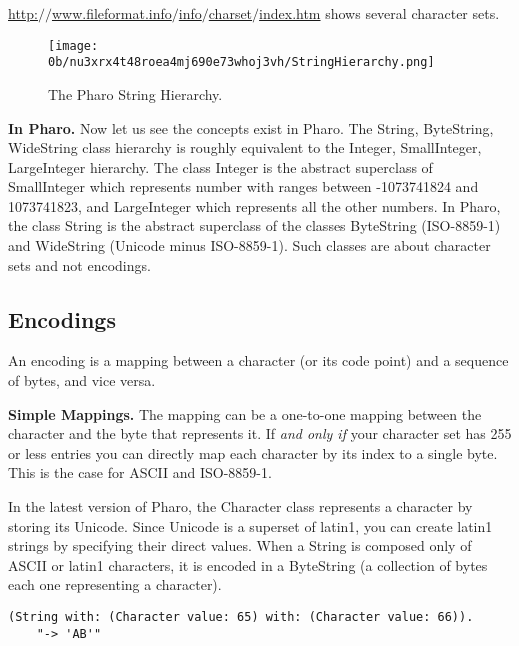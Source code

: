\documentclass[a4paper,10pt,twoside]{book}
\newcommand{\ct}[1]{{\small\ttfamily\textup{#1}}}
\begin{document}
\href{http://www.fileformat.info/info/charset/index.htm}{http:$/$$/$www.fileformat.info$/$info$/$charset$/$index.htm} shows several character sets. 

\begin{figure}[h!tbp]
	\begin{center}
		\texttt{[image: 0b/nu3xrx4t48roea4mj690e73whoj3vh/StringHierarchy.png]}
		\caption{The Pharo String Hierarchy.\label{book:inaction:servingfiles:characterencodings:charactersets:StringHierarchy}}
	\end{center}
\end{figure}


\textbf{In Pharo.} Now let us see the concepts exist in Pharo. The \ct{String}, \ct{ByteString}, \ct{WideString} class hierarchy is roughly equivalent to the \ct{Integer}, \ct{SmallInteger}, \ct{LargeInteger} hierarchy. The class \ct{Integer} is the abstract superclass of \ct{SmallInteger} which represents number with ranges between -1073741824 and 1073741823, and \ct{LargeInteger} which represents all the other numbers. In Pharo, the class \ct{String} is the abstract superclass of the classes \ct{ByteString} (ISO-8859-1) and \ct{WideString} (Unicode minus ISO-8859-1). Such classes are about character sets and not encodings.

\subsection{Encodings}
\label{book:inaction:servingfiles:characterencodings:encodings}

An encoding is a mapping between a character (or its code point) and a sequence of bytes, and vice versa.

\textbf{Simple Mappings.} The mapping can be a one-to-one mapping between the character and the byte that represents it. If \textit{and only if} your character set has 255 or less entries you can directly map each character by its index to a single byte. This is the case for ASCII and ISO-8859-1.

In the latest version of Pharo, the \ct{Character} class represents a character by storing its Unicode. Since Unicode is a superset of latin1, you can create latin1 strings by specifying their direct values. When a \ct{String} is composed only of ASCII or latin1 characters, it is encoded in a \ct{ByteString} (a collection of bytes each one representing a character).

\begin{lstlisting}
(String with: (Character value: 65) with: (Character value: 66)). 
	"-> 'AB'"
\end{lstlisting}
\end{document}
